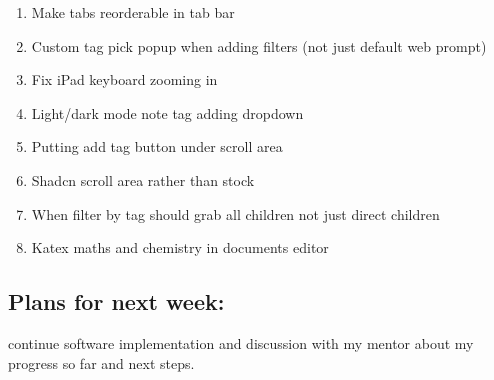 \begin{enumerate}
    \item Make tabs reorderable in tab bar 
    \item Custom tag pick popup when adding filters (not just default web prompt) 
    \item Fix iPad keyboard zooming in 
    \item Light/dark mode note tag adding dropdown 
    \item Putting add tag button under scroll area  
    \item Shadcn scroll area rather than stock 
    \item When filter by tag should grab all children not just direct children 
    \item Katex maths and chemistry in documents editor 
\end{enumerate}

\subsection*{Plans for next week:}
continue software implementation and discussion with my mentor about my progress so far and next steps.